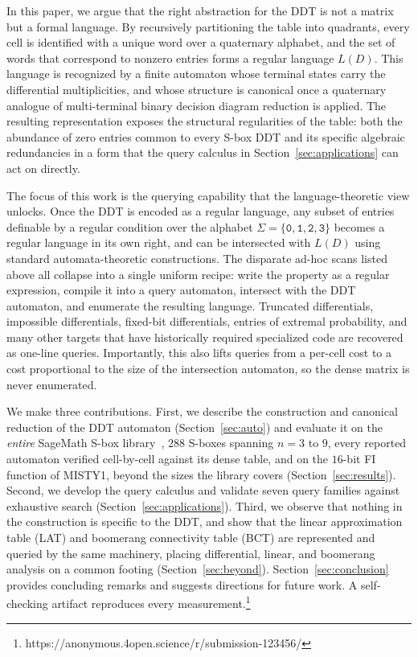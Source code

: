\documentclass[runningheads]{llncs}
\begin{document}
In this paper, we argue that the right abstraction for the DDT is not a matrix but
a formal language. By recursively partitioning the table into quadrants, every
cell is identified with a unique word over a quaternary alphabet, and the set of
words that correspond to nonzero entries forms a regular language $L(D)$. This
language is recognized by a finite automaton whose terminal states carry the
differential multiplicities, and whose structure is canonical once a quaternary
analogue of multi-terminal binary decision diagram reduction is applied. The
resulting representation exposes the structural regularities of the table:
both the abundance of zero entries common to every S-box DDT and its
specific algebraic redundancies in a form that the query calculus in
Section~\ref{sec:applications} can act on directly.

The focus of this work is the querying capability that the language-theoretic
view unlocks. Once the DDT is encoded as a
regular language, any subset of entries definable by a regular condition over the
alphabet $\Sigma = \{\texttt{0},\texttt{1},\texttt{2},\texttt{3}\}$ becomes a regular language in its own right, and can
be intersected with $L(D)$ using standard automata-theoretic constructions. The
disparate ad-hoc scans listed above all collapse into a single uniform recipe:
write the property as a regular expression, compile it into a query automaton,
intersect with the DDT automaton, and enumerate the resulting language. Truncated
differentials, impossible differentials, fixed-bit differentials, entries of
extremal probability, and many other targets that have historically required
specialized code are recovered as one-line queries. Importantly, this also lifts
queries from a per-cell cost to a cost proportional to the size of the
intersection automaton, so the dense matrix is never enumerated.

We make three contributions. First, we describe the construction and canonical
reduction of the DDT automaton (Section~\ref{sec:auto}) and evaluate it on the
\emph{entire} SageMath S-box library~\cite{Sage2026}, $288$ S-boxes spanning $n=3$ to
$9$, every reported automaton verified cell-by-cell against its dense table, and
on the $16$-bit FI function of MISTY1, beyond the sizes the library covers
(Section~\ref{sec:results}). Second, we develop the query calculus and
validate seven query families against exhaustive search
(Section~\ref{sec:applications}). Third, we observe that nothing in the
construction is specific to the DDT, and show that the linear approximation table
(LAT) and boomerang connectivity table (BCT) are represented and queried by the
same machinery, placing differential, linear, and boomerang analysis on a common
footing (Section~\ref{sec:beyond}). Section~\ref{sec:conclusion} provides concluding remarks and suggests directions for future work. A
self-checking artifact reproduces every measurement.\footnote{https://anonymous.4open.science/r/submission-123456/}
\end{document}
